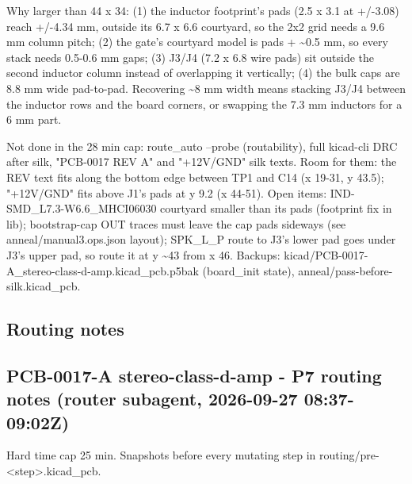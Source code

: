 \documentclass[11pt]{article}
\begin{document}
Why larger than 44 x 34: (1) the inductor footprint's pads (2.5 x 3.1 at +/-3.08) reach +/-4.34 mm, outside its 6.7 x 6.6 courtyard, so the 2x2 grid needs a 9.6 mm column pitch; (2) the gate's courtyard model is pads + \textasciitilde{}0.5 mm, so every stack needs 0.5-0.6 mm gaps; (3) J3/J4 (7.2 x 6.8 wire pads) sit outside the second inductor column instead of overlapping it vertically; (4) the bulk caps are 8.8 mm wide pad-to-pad. Recovering \textasciitilde{}8 mm width means stacking J3/J4 between the inductor rows and the board corners, or swapping the 7.3 mm inductors for a 6 mm part.

Not done in the 28 min cap: route\_auto --probe (routability), full kicad-cli DRC after silk, "PCB-0017 REV A" and "+12V/GND" silk texts. Room for them: the REV text fits along the bottom edge between TP1 and C14 (x 19-31, y 43.5); "+12V/GND" fits above J1's pads at y 9.2 (x 44-51). Open items: IND-SMD\_L7.3-W6.6\_MHCI06030 courtyard smaller than its pads (footprint fix in lib); bootstrap-cap OUT traces must leave the cap pads sideways (see anneal/manual3.ops.json layout); SPK\_L\_P route to J3's lower pad goes under J3's upper pad, so route it at y \textasciitilde{}43 from x 46. Backups: kicad/PCB-0017-A\_stereo-class-d-amp.kicad\_pcb.p5bak (board\_init state), anneal/pass-before-silk.kicad\_pcb.

\subsection*{Routing notes}
\subsection*{PCB-0017-A stereo-class-d-amp - P7 routing notes (router subagent, 2026-09-27 08:37-09:02Z)}
Hard time cap 25 min. Snapshots before every mutating step in routing/pre-\textless{}step\textgreater{}.kicad\_pcb.
\end{document}
